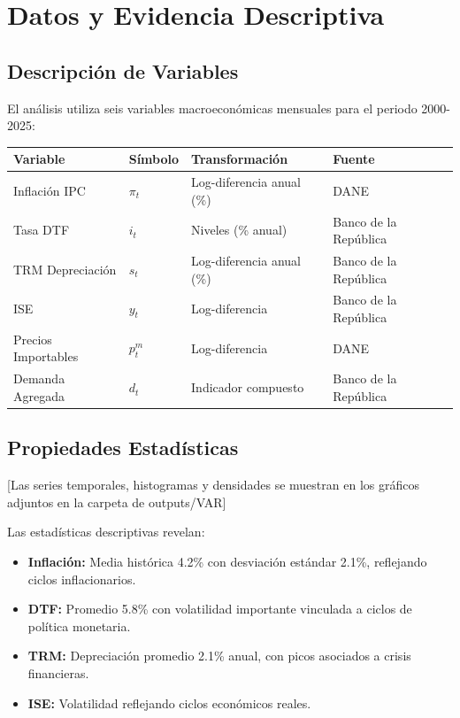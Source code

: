 \documentclass[12pt,a4paper]{article}
\begin{document}
\section{Datos y Evidencia Descriptiva}
\label{sec:datos}

\subsection{Descripción de Variables}

El análisis utiliza seis variables macroeconómicas mensuales para el periodo 2000-2025:

\begin{table}[H]
\centering
\small
\begin{tabular}{ll|ll}
\toprule
\textbf{Variable} & \textbf{Símbolo} & \textbf{Transformación} & \textbf{Fuente} \\
\midrule
Inflación IPC & $\pi_t$ & Log-diferencia anual (\%) & DANE \\
Tasa DTF & $i_t$ & Niveles (\% anual) & Banco de la República \\
TRM Depreciación & $s_t$ & Log-diferencia anual (\%) & Banco de la República \\
ISE & $y_t$ & Log-diferencia & Banco de la República \\
Precios Importables & $p^m_t$ & Log-diferencia & DANE \\
Demanda Agregada & $d_t$ & Indicador compuesto & Banco de la República \\
\bottomrule
\end{tabular}
\end{table}

\subsection{Propiedades Estadísticas}

[Las series temporales, histogramas y densidades se muestran en los gráficos adjuntos en la carpeta de outputs/VAR]

Las estadísticas descriptivas revelan:

\begin{itemize}
\item \textbf{Inflación:} Media histórica 4.2\% con desviación estándar 2.1\%, reflejando ciclos inflacionarios.
\item \textbf{DTF:} Promedio 5.8\% con volatilidad importante vinculada a ciclos de política monetaria.
\item \textbf{TRM:} Depreciación promedio 2.1\% anual, con picos asociados a crisis financieras.
\item \textbf{ISE:} Volatilidad reflejando ciclos económicos reales.
\end{itemize}
\end{document}
